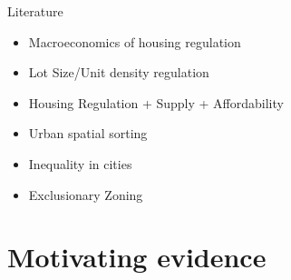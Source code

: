 \documentclass{beamer}
\theoremstyle{plain}
\begin{document}
\begin{frame}{Literature}
	\fontsize{8pt}{7.2}	
	\begin{itemize}
		\itemsep1em		
			
		\item \color{red} Macroeconomics of housing regulation \citep{hseihmoretti} \citep{durantonpugaurbgrowth} \citep{parkho} \citep{bunten} \citep{hop} \citep{ganongshoag} \citep{superstarcities} 


		\item \color{red} Lot Size/Unit density regulation \citep{kulka} \citep{Song} \citep{KSC} \citep{zabel} \citep{gyourko2021} \citep{griesonwhite} \citep{gyourkovoith1997} \citep{davidoff2022}
		
		\item \color{red} Housing Regulation + Supply + Affordability \citep{BSH} \citep{saiz2010} \citep{asquithetallocaleffects} \citep{mastwarding} \citep{albouyetal} \citep{bbheight} \citep{mills2005} \citep{bruecknersingh} \citep{BruecknerFuGu} \citep{acosta} \citep{martynov} \citep{turner2014} \citep{gyourkomolloy}
		
		\item \color{purple} Urban spatial sorting \citep{diamond2016} \citep{couturehandbury} \citep{su2021} \citep{bshartley2020} \citep{Coutureetal} \citep{AlmagroDI} \citep{parispoor} \citep{ccpoortransport} \citep{Gentrificationcycles} \cite{LeeandLin}
		
		\item \color{purple} Inequality in cities \citep{ineqcitysize} \citep{spatialsorting} \citep{FogliGuerrieri}
		
		\item \color{teal} Exclusionary Zoning \citep{Hamilton1975} \citep{calabresetal} \citep{keepingpeopleout} \citep{ineffTiebout} \citep{barcoate} \citep{brueckner2021}
	\end{itemize}
\end{frame}

\section{Motivating evidence}
\end{document}
